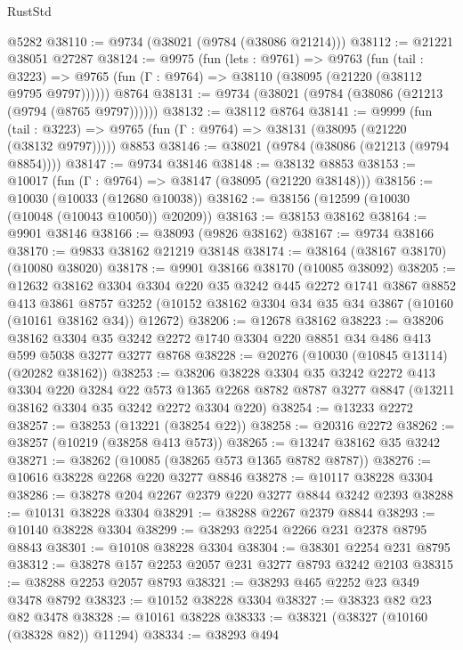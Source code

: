 \begin{lexlean}{RustStd}
\begin{coremodule}
    @5282
@38110 := @9734 (@38021 (@9784 (@38086 @21214)))
@38112 := @21221 @38051 @27287
@38124 := @9975
    (fun (lets : @9761) =>
    @9763
      (fun (tail : @3223) =>
      @9765 (fun (Γ : @9764) => @38110 (@38095 (@21220 (@38112 @9795 @9797))))))
    @8764
@38131 := @9734 (@38021 (@9784 (@38086 (@21213 (@9794 (@8765 @9797))))))
@38132 := @38112 @8764
@38141 := @9999
    (fun (tail : @3223) => @9765 (fun (Γ : @9764) => @38131 (@38095 (@21220 (@38132 @9797)))))
    @8853
@38146 := @38021 (@9784 (@38086 (@21213 (@9794 @8854))))
@38147 := @9734 @38146
@38148 := @38132 @8853
@38153 := @10017 (fun (Γ : @9764) => @38147 (@38095 (@21220 @38148)))
@38156 := @10030 (@10033 (@12680 @10038))
@38162 := @38156 (@12599 (@10030 (@10048 (@10043 @10050)) @20209))
@38163 := @38153 @38162
@38164 := @9901 @38146
@38166 := @38093 (@9826 @38162)
@38167 := @9734 @38166
@38170 := @9833 @38162 @21219 @38148
@38174 := @38164 (@38167 @38170) (@10080 @38020)
@38178 := @9901 @38166 @38170 (@10085 @38092)
@38205 := @12632
    @38162
    @3304
    @3304
    @220
    @35
    @3242
    @445
    @2272
    @1741
    @3867
    @8852
    @413
    @3861
    @8757
    @3252
    (@10152 @38162 @3304 @34 @35 @34 @3867 (@10160 (@10161 @38162 @34)) @12672)
@38206 := @12678 @38162
@38223 := @38206
    @38162
    @3304
    @35
    @3242
    @2272
    @1740
    @3304
    @220
    @8851
    @34
    @486
    @413
    @599
    @5038
    @3277
    @3277
    @8768
@38228 := @20276 (@10030 (@10845 @13114) (@20282 @38162))
@38253 := @38206
    @38228
    @3304
    @35
    @3242
    @2272
    @413
    @3304
    @220
    @3284
    @22
    @573
    @1365
    @2268
    @8782
    @8787
    @3277
    @8847
    (@13211 @38162 @3304 @35 @3242 @2272 @3304 @220)
@38254 := @13233 @2272
@38257 := @38253 (@13221 (@38254 @22))
@38258 := @20316 @2272
@38262 := @38257 (@10219 (@38258 @413 @573))
@38265 := @13247 @38162 @35 @3242
@38271 := @38262 (@10085 (@38265 @573 @1365 @8782 @8787))
@38276 := @10616 @38228 @2268 @220 @3277 @8846
@38278 := @10117 @38228 @3304
@38286 := @38278 @204 @2267 @2379 @220 @3277 @8844 @3242 @2393
@38288 := @10131 @38228 @3304
@38291 := @38288 @2267 @2379 @8844
@38293 := @10140 @38228 @3304
@38299 := @38293 @2254 @2266 @231 @2378 @8795 @8843
@38301 := @10108 @38228 @3304
@38304 := @38301 @2254 @231 @8795
@38312 := @38278 @157 @2253 @2057 @231 @3277 @8793 @3242 @2103
@38315 := @38288 @2253 @2057 @8793
@38321 := @38293 @465 @2252 @23 @349 @3478 @8792
@38323 := @10152 @38228 @3304
@38327 := @38323 @82 @23 @82 @3478
@38328 := @10161 @38228
@38333 := @38321 (@38327 (@10160 (@38328 @82)) @11294)
@38334 := @38293 @494

\end{coremodule}
\end{lexlean}
